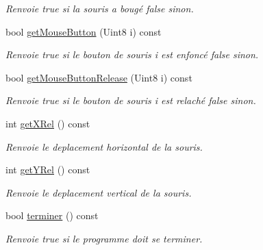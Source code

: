\begin{DoxyCompactItemize}
\begin{DoxyCompactList}\small\item\em Renvoie true si la souris a bougé false sinon. \end{DoxyCompactList}\item 
\hypertarget{classInput_ae1d91a39827387378f2aa7152fdcc482}{bool \hyperlink{classInput_ae1d91a39827387378f2aa7152fdcc482}{get\-Mouse\-Button} (Uint8 i) const }\label{classInput_ae1d91a39827387378f2aa7152fdcc482}

\begin{DoxyCompactList}\small\item\em Renvoie true si le bouton de souris i est enfoncé false sinon. \end{DoxyCompactList}\item 
\hypertarget{classInput_abb05d3dadc328f090cbf71088691bade}{bool \hyperlink{classInput_abb05d3dadc328f090cbf71088691bade}{get\-Mouse\-Button\-Release} (Uint8 i) const }\label{classInput_abb05d3dadc328f090cbf71088691bade}

\begin{DoxyCompactList}\small\item\em Renvoie true si le bouton de souris i est relaché false sinon. \end{DoxyCompactList}\item 
\hypertarget{classInput_a0bda65e8c8f6511c5ed44c38b95ed0a3}{int \hyperlink{classInput_a0bda65e8c8f6511c5ed44c38b95ed0a3}{get\-X\-Rel} () const }\label{classInput_a0bda65e8c8f6511c5ed44c38b95ed0a3}

\begin{DoxyCompactList}\small\item\em Renvoie le deplacement horizontal de la souris. \end{DoxyCompactList}\item 
\hypertarget{classInput_ad761d98ab768e78ce12a5601ba220f06}{int \hyperlink{classInput_ad761d98ab768e78ce12a5601ba220f06}{get\-Y\-Rel} () const }\label{classInput_ad761d98ab768e78ce12a5601ba220f06}

\begin{DoxyCompactList}\small\item\em Renvoie le deplacement vertical de la souris. \end{DoxyCompactList}\item 
\hypertarget{classInput_a2d977cfea35296f15cd55829f99be9a4}{bool \hyperlink{classInput_a2d977cfea35296f15cd55829f99be9a4}{terminer} () const }\label{classInput_a2d977cfea35296f15cd55829f99be9a4}

\begin{DoxyCompactList}\small\item\em Renvoie true si le programme doit se terminer. \end{DoxyCompactList}\end{DoxyCompactItemize}


